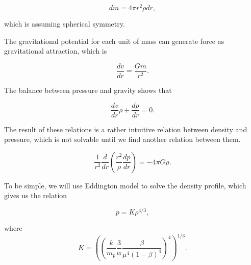 \documentclass{tufte-handout}
\begin{document}
\begin{equation}
    dm = 4\pi r^2 \rho dr ,
\end{equation}

which is assuming spherical symmetry.

The gravitational potential for each unit of mass can generate force as gravitational attraction, which is

\begin{equation*}
    \frac{dv}{dr} = \frac{G m}{r^2}.
\end{equation*}

The balance between pressure and gravity shows that

\begin{equation*}
    \frac{dv}{dr} \rho + \frac{dp}{dr} = 0.
\end{equation*}

The result of these relations is a rather intuitive relation between density and pressure, which is not solvable until we find another relation between them.

\begin{equation*}
    \frac{1}{r^2} \frac{d}{dr} \left( \frac{r^2}{\rho} \frac{dp}{dr} \right) = -4\pi G\rho.
\end{equation*}

To be simple, we will use Eddington model to solve the density profile, which gives us the relation

\begin{equation*}
    p = K \rho^{4/3},
\end{equation*}


where 
\begin{equation*}
    K = \left(  \left( \frac{k}{m_p} \frac{3}{\alpha} \frac{\beta}{\mu^4(1-\beta)^4}  \right)^4  \right)^{1/3}.
\end{equation*}






\end{document}
